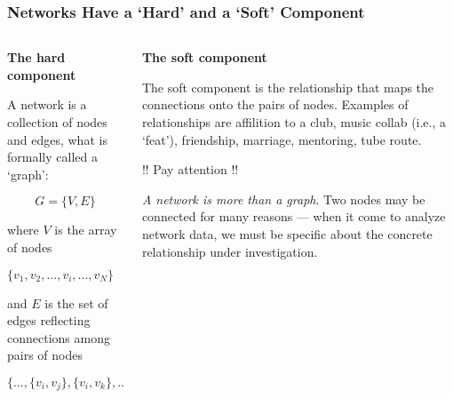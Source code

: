 \documentclass[notes, aspectratio=1610]{beamer}
\begin{document}
\begin{frame}[t]
	\frametitle{Networks Have a `Hard' and a `Soft' Component}
	\begin{small}
	\begin{columns}[t]
		\begin{column}{0.45\textwidth}
			\begin{center}
				\textbf{The hard component}
			\end{center}

			A network is a collection of nodes and edges, what is
			formally called a `graph':

			\vspace{-0.75em}

			\begin{equation}
				G = \{V, E\}
			\end{equation}

			where $V$ is the array of nodes 

			\vspace{1em}

			$\{v_{1}, v_{2}, ... , v_{i}, ... , v_{N}\}$
			
			\vspace{1em}
			
			and $E$ is the set of edges reflecting connections among
			pairs of nodes

			\vspace{1em}
			
			$\{..., \{v_{i}, v_{j}\}, \{v_{i}, v_{k}\}, ...\}$
		\end{column}
		\begin{column}{0.45\textwidth}
			\begin{center}
				\textbf{The soft component}
			\end{center}

			The soft component is the relationship that maps 
			the connections onto the pairs of nodes.
			Examples of relationships are affilition to a club,
		        music collab (i.e., a `feat'), friendship, marriage, 
			mentoring, tube route.

			\begin{center}
			!! Pay attention !!
			\end{center}

			\emph{A network is more than a graph}. 
			Two nodes may be connected for many reasons --- 
			when it come to analyze network data, we must be 
			specific about the concrete relationship under 
			investigation.
		\end{column}
	\end{columns}
\end{small}
\end{frame}
\end{document}
